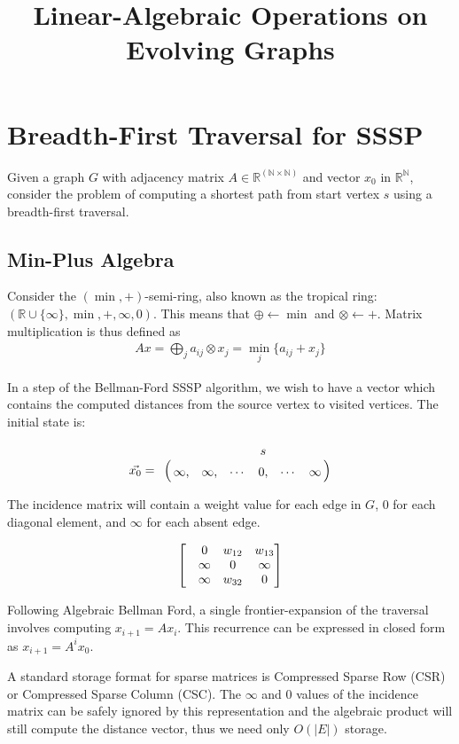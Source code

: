 \documentclass[11pt]{article}
\title{Linear-Algebraic Operations on Evolving Graphs}
\date{}
\begin{document}
\maketitle

\section{Breadth-First Traversal for SSSP}

Given a graph $G$ with adjacency matrix $A \in \mathbb{R^{(N \times N)}}$ and vector $x_0$ in $\mathbb{R^N}$, consider the problem of computing a shortest path from start vertex $s$ using a breadth-first traversal. 

\subsection{Min-Plus Algebra}
Consider the $(\min,+)$-semi-ring, also known as the tropical ring: $(\mathbb{R} \cup \{\infty\},\min,+,\infty,0)$. This means that $\oplus \gets \min$ and $\otimes \gets +$. Matrix multiplication is thus defined as \begin{align}Ax = \bigoplus_j a_{ij} \otimes x_j = \min_j\{a_{ij}+x_j\}\end{align}

In a step of the Bellman-Ford SSSP algorithm, we wish to have a vector which contains the computed distances from the source vertex to visited vertices. The initial state is:

\begin{align}\vec{x_0} = \bordermatrix{ 
& & & & s&  \cr
& \infty, & \infty, & \cdots & 0,& \cdots &\infty \cr
} \end{align}

The incidence matrix will contain a weight value for each edge in $G$, 0 for each diagonal element, and $\infty$ for each absent edge.

\begin{align}\begin{bmatrix}
& 0 & w_{12} & w_{13}  \cr
& \infty & 0 &  \infty   \cr
& \infty& w_{32} & 0   
\end{bmatrix} \end{align}

Following Algebraic Bellman Ford, a single frontier-expansion of the traversal involves computing $x_{i+1} = Ax_i$. This recurrence can be expressed in closed form as $x_{i+1} = A^i x_0$.

A standard storage format for sparse matrices is Compressed Sparse Row (CSR) or Compressed Sparse Column (CSC). The $\infty$ and 0 values of the incidence matrix can be safely ignored by this representation and the algebraic product will still compute the distance vector, thus we need only $O(|E|)$ storage.
\end{document}
